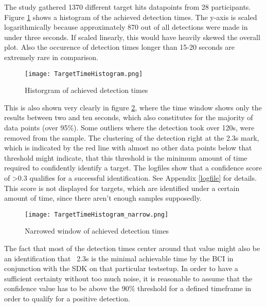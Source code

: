             The study gathered 1370 different target hits datapoints from 28 participants. Figure \ref*{time-hist} shows a histogram of the achieved detection times. The y-axis is scaled logarithmically because approximately 870 out of all detections were made in under three seconds. If scaled linearly, this would have heavily skewed the overall plot. Also the occurence of detection times longer than 15-20 seconds are extremely rare in comparison.

            \begin{figure}[h]     %
                \centering
                \texttt{[image: TargetTimeHistogram.png]} 
                \caption{Historgram of achieved detection times}\label{time-hist}
            \end{figure}    
            
            This is also shown very clearly in figure \ref*{time-hist-narrow}, where the time window shows only the results between two and ten seconds, which also constitutes for the majority of data points (over 95\%). Some outliers where the detection took over 120s, were removed from the sample. The clustering of the detection right at the 2.3s mark, which is indicated by the red line with almost no other data points below that threshold might indicate, that this threshold is the minimum amount of time required to confidently identify a target. The logfiles show that a confidence score of >0.3 qualifies for a successful identification. See Appendix \ref*{logfile} for details. This score is not displayed for targets, which are identified under a certain amount of time, since there aren't enough samples supposedly.

            \begin{figure}[h]     %
                \centering
                \texttt{[image: TargetTimeHistogram\_narrow.png]} 
                \caption{Narrowed window of achieved detection times }\label{time-hist-narrow}
            \end{figure} 

            The fact that most of the detection times center around that value might also be an identification that ~2.3s is the minimal achievable time by the BCI in conjunction with the SDK on that particular testsetup. In order to have a sufficient certainty without too much noise, it is reasonable to assume that the confidence value has to be above the 90\% threshold for a defined timeframe in order to qualify for a positive detection.

